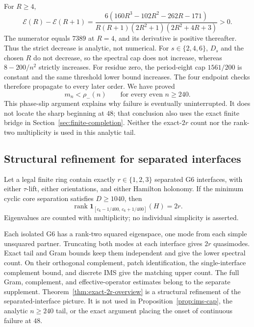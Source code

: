 For \(R\geq4\),
\[
\mathcal E(R)-\mathcal E(R+1)
=\frac{6(160R^3-102R^2-262R-171)}
{R(R+1)(2R^2+1)(2R^2+4R+3)}>0.
\]
The numerator equals \(7389\) at \(R=4\), and its derivative is positive
thereafter.  Thus the strict decrease is analytic, not numerical.
For \(s\in\{2,4,6\}\), \(D_s\) and the chosen \(R\) do not decrease, so the
spectral cap does not increase, whereas \(8-200/n^2\) strictly increases.
For residue zero, the period-eight cap \(1561/200\) is constant and the same
threshold lower bound increases.  The four endpoint checks therefore
propagate to every later order.  We have proved
\[
m_n<\rho_-(n)\qquad
\text{for every even }n\geq240.
\]
This phase-slip argument explains why failure is eventually uninterrupted.
It does not locate the sharp beginning at \(48\); that conclusion also uses
the exact finite bridge in Section~\ref{sec:finite-completion}.
Neither the exact-\(2r\) count nor the rank-two multiplicity is used in this
analytic tail.

\subsection{Structural refinement for separated interfaces}
\label{subsec:separated-interface-refinement}

\begin{theorem}\label{thm:exact-2r-overview}
Let a legal finite ring contain exactly \(r\in\{1,2,3\}\) separated G6
interfaces, with either \(\tau\)-lift, either orientations, and either
Hamilton holonomy.  If the
minimum cyclic core separation satisfies \(D\geq1040\), then
\[
\operatorname{rank}
\mathbf 1_{[c_6-1/400,\,c_6+1/400]}(H)=2r.
\]
Eigenvalues are counted with multiplicity; no individual simplicity is
asserted.
\end{theorem}

Each isolated G6 has a rank-two squared eigenspace, one mode from each simple
unsquared partner.  Truncating both modes at each interface gives \(2r\)
quasimodes.  Exact tail and Gram bounds keep them independent and give the
lower spectral count.  On their orthogonal complement, patch identification,
the single-interface complement bound, and discrete IMS give the matching
upper count.  The full Gram, complement, and effective-operator estimates
belong to the separate supplement.  Theorem~\ref{thm:exact-2r-overview} is
a structural refinement of the
separated-interface picture.  It is not used in
Proposition~\ref{prop:ims-cap}, the analytic \(n\geq240\) tail, or the exact
argument placing the onset of continuous failure at \(48\).
